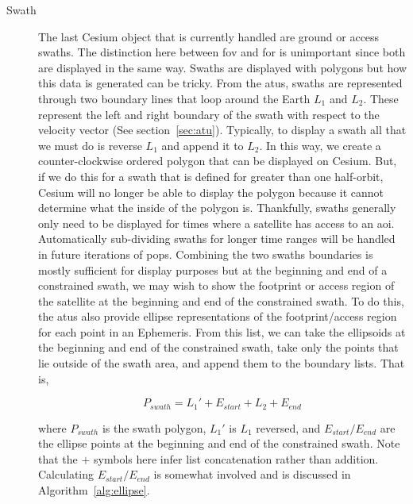\begin{description}
    \item[Swath] The last Cesium object that is currently handled are ground or
	access swaths. The distinction here between \gls{fov} and \gls{for} is
	unimportant since both are displayed in the same way. Swaths are
	displayed with polygons but how this data is generated can be tricky.
	From the \glspl{atu}, swaths are represented through two boundary lines
	that loop around the Earth $L_1$ and $L_2$. These represent the left
	and right boundary of the swath with respect to the velocity vector
	(See section~\ref{sec:atu}).  Typically, to display a swath all that we
	must do is reverse $L_1$ and append it to $L_2$. In this way, we create
	a counter-clockwise ordered polygon that can be displayed on Cesium.
	But, if we do this for a swath that is defined for greater than one
	half-orbit, Cesium will no longer be able to display the polygon
	because it cannot determine what the inside of the polygon is.
	Thankfully, swaths generally only need to be displayed for times where
	a satellite has access to an \gls{aoi}. Automatically sub-dividing
	swaths for longer time ranges will be handled in future iterations of
	\gls{pops}.  Combining the two swaths boundaries is mostly sufficient
	for display purposes but at the beginning and end of a constrained
	swath, we may wish to show the footprint or access region of the
	satellite at the beginning and end of the constrained swath. To do
	this, the \glspl{atu} also provide ellipse representations of the
	footprint/access region for each point in an Ephemeris.  From this
	list, we can take the ellipsoids at the beginning and end of the
	constrained swath, take only the points that lie outside of the swath
	area, and append them to the boundary lists.  That is, 

	\begin{equation*} 
	    P_{swath} = L_1' + E_{start} + L_2 + E_{end} 
	\end{equation*} 

	where $P_{swath}$ is the swath polygon, $L_1'$
	is $L_1$ reversed, and $E_{start}/E_{end}$ are the ellipse points at
	the beginning and end of the constrained swath. Note that the $+$
	symbols here infer list concatenation rather than addition. Calculating
	$E_{start}/E_{end}$ is somewhat involved and is discussed in
	Algorithm~\ref{alg:ellipse}.
	

\end{description}
